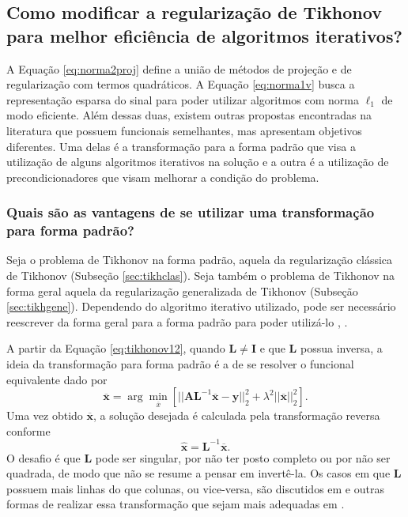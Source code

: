 \subsection{Como modificar a regularização de Tikhonov para melhor eficiência de algoritmos iterativos?}
A Equação \eqref{eq:norma2proj} define a união de métodos de projeção e de regularização com termos quadráticos. A Equação \eqref{eq:norma1v} busca a representação esparsa do sinal para poder utilizar algoritmos com norma $\ell_1$ de modo eficiente. Além dessas duas, existem outras propostas encontradas na literatura que possuem funcionais semelhantes, mas apresentam objetivos diferentes. Uma delas é a transformação para a forma padrão que visa a utilização de alguns algoritmos iterativos na solução e a outra é a utilização de precondicionadores que visam melhorar a condição do problema. 


\subsubsection{Quais são as vantagens de se utilizar uma transformação para forma padrão?}

Seja o problema de Tikhonov na forma padrão, aquela da regularização clássica de Tikhonov (Subseção \ref{sec:tikhclas}). Seja também o problema de Tikhonov na forma geral aquela da regularização generalizada de Tikhonov (Subseção  \ref{sec:tikhgene}). Dependendo do algoritmo iterativo utilizado, pode ser necessário reescrever da forma geral para a forma padrão  para poder utilizá-lo \cite[págs. 172, 181]{hansen2010discrete}, \cite[pág. 221]{engl1996regularization}.  



A partir da Equação \eqref{eq:tikhonov12}, quando $\mathbf{L} \neq \mathbf{I}$ e que $\mathbf{L}$ possua inversa, a ideia da transformação para forma padrão é a de se resolver o funcional equivalente dado por 
\begin{equation}
\mathbf{\overline{x}} = \arg\min\limits_{\overline{x}} \left[ \vert \vert \mathbf{A} \mathbf{L}^{-1} \mathbf{\overline{x}} - \mathbf{y} \vert \vert^2_2 + \lambda^2 \vert \vert \mathbf{\overline{x}} \vert \vert_2^2 \right].
\label{eq:tikhstandard}
\end{equation}
Uma vez obtido $\mathbf{\overline{x}}$, a solução desejada é calculada pela transformação reversa conforme
\begin{equation}
\hat{\mathbf{x}} = \mathbf{L}^{-1} \mathbf{\overline{x}}.
\label{eq:tikhstandard2}
\end{equation}
O desafio é que $ \mathbf{L}$ pode ser singular, por não ter posto completo ou por não ser quadrada, de modo que não se resume a pensar em invertê-la. Os casos em que $ \mathbf{L}$ possuem mais linhas do que colunas, ou vice-versa, são discutidos em \cite[pág. 181]{hansen2010discrete} e outras formas de realizar essa transformação que sejam mais adequadas em \cite[Seção 8.5]{hansen2010discrete}. 


